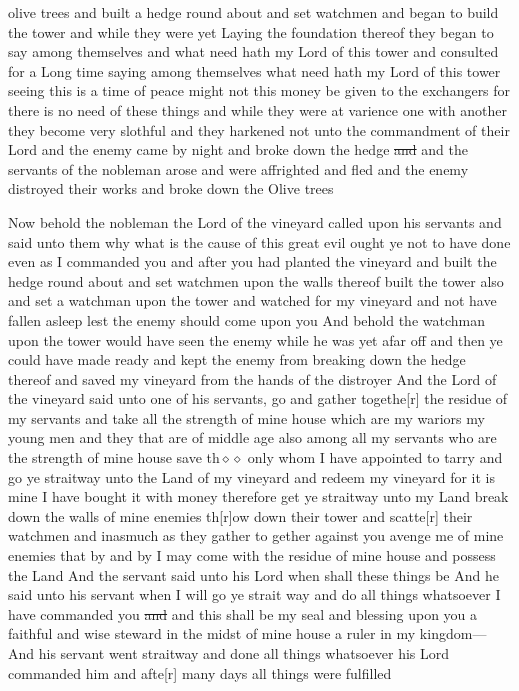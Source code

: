 olive trees and built a hedge round about and set watchmen and began to build the tower and while they were yet Laying the foundation thereof they began to say among themselves and what need hath my Lord of this tower and consulted for a Long time saying among themselves what need hath my Lord of this tower seeing this is a time of peace might not this money be given to the exchangers for there is no need of these things and while they were at varience one with another they become very slothful and they harkened not unto the commandment of their Lord and the enemy came by night and broke down the hedge \sout{and} and the servants of the nobleman arose and were affrighted and fled and the enemy distroyed their works and broke down the Olive trees
				
				Now behold the nobleman the Lord of the vineyard called upon his servants and said unto them why what is the cause of this great evil ought ye not to have done even as I commanded you and after you had planted the vineyard and built the hedge round about and set watchmen upon the walls thereof built the tower also and set a watchman upon the tower and watched for my vineyard and not have fallen asleep lest the enemy should come upon you And behold the watchman upon the tower would have seen the enemy while he was yet afar off and then ye could have made ready and kept the enemy from breaking down the hedge thereof and saved my vineyard from the hands of the distroyer And the Lord of the vineyard said unto one of his servants, go and gather togethe[r] the residue of my servants and take all the strength of mine house which are my wariors my young men and they that are of middle age also among all my servants who are the strength of mine house save th$\diamond\diamond$ only whom I have appointed to tarry and go ye straitway unto the Land of my vineyard and redeem my vineyard for it is mine I have bought it with money therefore get ye straitway unto my Land break down the walls of mine enemies th[r]ow down their tower and scatte[r] their watchmen and inasmuch as they gather to gether against you avenge me of mine enemies that by and by I may come with the residue of mine house and possess the Land And the servant said unto his Lord when shall these things be And he said unto his servant when I will go ye strait way and do all things whatsoever I have commanded you \sout{and} and this shall be my seal and blessing upon you a faithful and wise steward in the midst of mine house a ruler in my kingdom--- And his servant went straitway and done all things whatsoever his Lord commanded him and afte[r] many days all things were fulfilled
				
